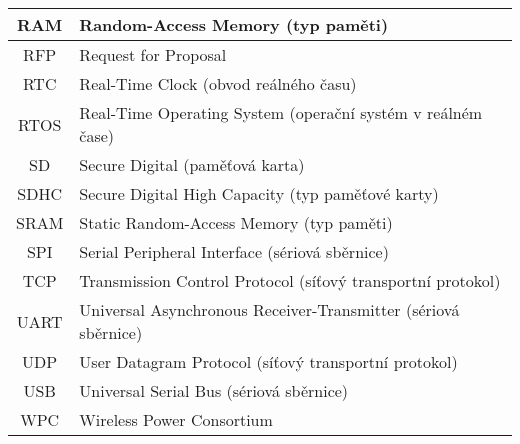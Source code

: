 \begin{longtable}{|c|l|}
RAM     & Random-Access Memory (typ paměti)                                         \\ \hline
RFP     & Request for Proposal                                                      \\ \hline
RTC     & Real-Time Clock (obvod reálného času)                                     \\ \hline
RTOS    & Real-Time Operating System (operační systém v reálném čase)               \\ \hline
SD      & Secure Digital (paměťová karta)                                           \\ \hline
SDHC    & Secure Digital High Capacity (typ paměťové karty)                         \\ \hline
SRAM    & Static Random-Access Memory (typ paměti)                                  \\ \hline
SPI     & Serial Peripheral Interface (sériová sběrnice)                            \\ \hline
TCP     & Transmission Control Protocol (síťový transportní protokol)               \\ \hline
UART    & Universal Asynchronous Receiver-Transmitter (sériová sběrnice)            \\ \hline
UDP     & User Datagram Protocol (síťový transportní protokol)                      \\ \hline
USB     & Universal Serial Bus (sériová sběrnice)                                   \\ \hline
WPC     & Wireless Power Consortium                                                 \\ \hline

\end{longtable}